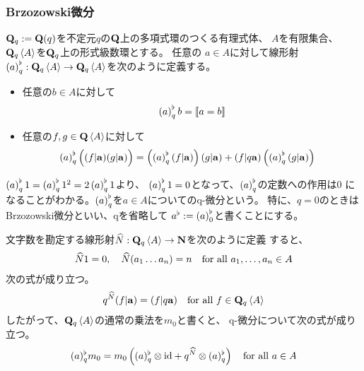 {\subsubsection{Brzozowski微分}\label{s3:Brzozowski微分} %
	$\mathbf{Q}_q:=\mathbf{Q}(q)$を不定元$q$の$\mathbf{Q}$上の多項式環のつくる有理式体、
	$A$を有限集合、$\mathbf{Q}_q\mathinner{\langle{A}\rangle}$を$\mathbf{Q}_q$上の形式級数環とする。
	任意の $a\in A$に対して線形射
	$\mathinner{\left({a}\right)}^\flat_q:\mathbf{Q}_q\mathinner{\langle{A}\rangle}\to\mathbf{Q}_q\mathinner{\langle{A}\rangle}$を次のように定義する。
	\begin{itemize}\setlength{\itemsep}{-1mm} %
		\item 任意の$b\in A$に対して
		\begin{equation*}\begin{split}
			\mathinner{\left({a}\right)}_q^\flat b = \mathinner{[\![a=b]\!]}
		\end{split}\end{equation*}
		\item 任意の$f,g\in\mathbf{Q}\mathinner{\langle{A}\rangle}$に対して
		\begin{equation*}\begin{split}
			\mathinner{\left({a}\right)}^\flat_q \mathinner{\Bigl({(f|{\ensuremath{\mathbf{a}}})(g|{\ensuremath{\mathbf{a}}})}\Bigr)}
			&= \mathinner{\Bigl({\mathinner{\left({a}\right)}^\flat_q (f|{\ensuremath{\mathbf{a}}})}\Bigr)} (g|{\mathbf{a}}) 
				+ (f|q{\mathbf{a}}) \mathinner{\Bigl({\mathinner{\left({a}\right)}^\flat_q(g|{\ensuremath{\mathbf{a}}})}\Bigr)}
		\end{split}\end{equation*}
	\end{itemize} %
	$\mathinner{\left({a}\right)}^\flat_q 1=\mathinner{\left({a}\right)}^\flat_q 1^2=2\mathinner{\left({a}\right)}^\flat_q 1$より、
	$\mathinner{\left({a}\right)}^\flat_q 1=0$となって、$\mathinner{\left({a}\right)}^\flat_q$の定数への作用は$0$
	になることがわかる。$\mathinner{\left({a}\right)}^\flat_q$を$a\in A$についてのq-微分という。
	特に、$q=0$のときはBrzozowski微分といい、qを省略して
	$a^\flat:=\mathinner{\left({a}\right)}^\flat_0$と書くことにする。

	文字数を勘定する線形射${\widehat{N}}:\mathbf{Q}_q\mathinner{\langle{A}\rangle}\to\mathbf{N}$を次のように定義
	すると、
	\begin{equation*}\begin{split}
		{\widehat{N}} 1 = 0,\quad {\widehat{N}}(a_1\dots a_n) = n
		\quad\text{for all } a_1,\dots,a_n\in A
	\end{split}\end{equation*}
	次の式が成り立つ。
	\begin{equation*}\begin{split}
		q^{\widehat{N}} (f|{\mathbf{a}}) = (f|q{\mathbf{a}})
		\quad\text{for all } f\in \mathbf{Q}_q\mathinner{\langle{A}\rangle}
	\end{split}\end{equation*}
	したがって、$\mathbf{Q}_q\mathinner{\langle{A}\rangle}$の通常の乗法を$m_0$と書くと、
	q-微分について次の式が成り立つ。
	\begin{equation*}\begin{split}
		(a)_q^\flat m_0 = m_0\mathinner{\left({(a)_q^\flat\otimes{\ensuremath{\operatorname{id}}}+ q^{\widehat{N}}\otimes(a)_q^\flat}\right)} \quad\text{for all } a\in A
	\end{split}\end{equation*}

}
